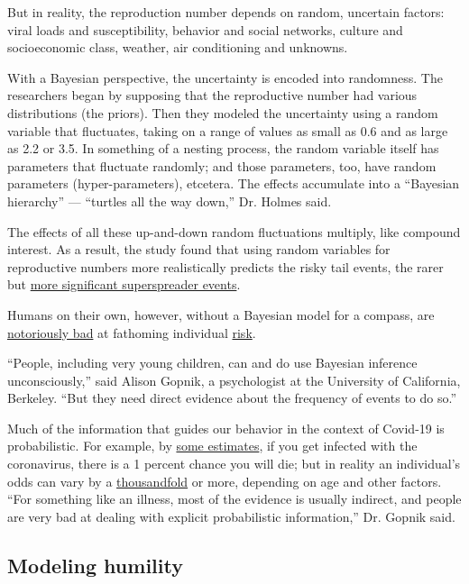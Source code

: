 But in reality, the reproduction number depends on random, uncertain
factors: viral loads and susceptibility, behavior and social networks,
culture and socioeconomic class, weather, air conditioning and unknowns.

With a Bayesian perspective, the uncertainty is encoded into randomness.
The researchers began by supposing that the reproductive number had
various distributions (the priors). Then they modeled the uncertainty
using a random variable that fluctuates, taking on a range of values as
small as 0.6 and as large as 2.2 or 3.5. In something of a nesting
process, the random variable itself has parameters that fluctuate
randomly; and those parameters, too, have random parameters
(hyper-parameters), etcetera. The effects accumulate into a ``Bayesian
hierarchy'' --- ``turtles all the way down,'' Dr. Holmes said.

The effects of all these up-and-down random fluctuations multiply, like
compound interest. As a result, the study found that using random
variables for reproductive numbers more realistically predicts the risky
tail events, the rarer but
\href{https://www.nytimes.com/2020/06/30/science/how-coronavirus-spreads.html}{more
significant superspreader events}.

Humans on their own, however, without a Bayesian model for a compass,
are \href{https://en.wikipedia.org/wiki/Prospect_theory}{notoriously
bad} at fathoming individual
\href{https://twitter.com/xkcdComic/status/1283437923421937666/photo/1}{risk}.

``People, including very young children, can and do use Bayesian
inference unconsciously,'' said Alison Gopnik, a psychologist at the
University of California, Berkeley. ``But they need direct evidence
about the frequency of events to do so.''

Much of the information that guides our behavior in the context of
Covid-19 is probabilistic. For example, by
\href{https://www.nature.com/articles/d41586-020-01738-2}{some
estimates}, if you get infected with the coronavirus, there is a 1
percent chance you will die; but in reality an individual's odds can
vary by a
\href{https://medium.com/wintoncentre/how-much-normal-risk-does-covid-represent-4539118e1196}{thousandfold}
or more, depending on age and other factors. ``For something like an
illness, most of the evidence is usually indirect, and people are very
bad at dealing with explicit probabilistic information,'' Dr. Gopnik
said.

\hypertarget{modeling-humility}{%
\subsection{Modeling humility}\label{modeling-humility}}

